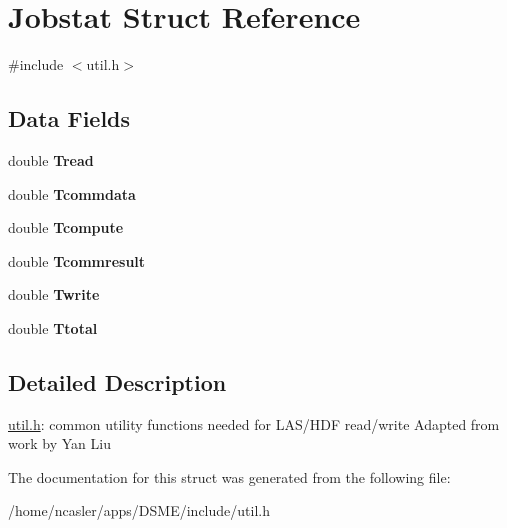 \hypertarget{structJobstat}{}\section{Jobstat Struct Reference}
\label{structJobstat}


{\ttfamily \#include $<$util.\+h$>$}

\subsection*{Data Fields}
\begin{DoxyCompactItemize}
\item 
\hypertarget{structJobstat_ada1786a003b0dc56e66dfe9b21ebb00e}{}double {\bfseries Tread}\label{structJobstat_ada1786a003b0dc56e66dfe9b21ebb00e}

\item 
\hypertarget{structJobstat_af277ce2c5fba23904835f4ddcabcb0d1}{}double {\bfseries Tcommdata}\label{structJobstat_af277ce2c5fba23904835f4ddcabcb0d1}

\item 
\hypertarget{structJobstat_ae45f1f3fb3677c761fc75feb90ff8c8a}{}double {\bfseries Tcompute}\label{structJobstat_ae45f1f3fb3677c761fc75feb90ff8c8a}

\item 
\hypertarget{structJobstat_a2197fac600e97d5034757ad75eb0ab39}{}double {\bfseries Tcommresult}\label{structJobstat_a2197fac600e97d5034757ad75eb0ab39}

\item 
\hypertarget{structJobstat_aad5476e2b35b4db54cdec349c25bd1c4}{}double {\bfseries Twrite}\label{structJobstat_aad5476e2b35b4db54cdec349c25bd1c4}

\item 
\hypertarget{structJobstat_aaa924e7bd413313082af0f7921065dcc}{}double {\bfseries Ttotal}\label{structJobstat_aaa924e7bd413313082af0f7921065dcc}

\end{DoxyCompactItemize}


\subsection{Detailed Description}
\hyperlink{util_8h_source}{util.\+h}\+: common utility functions needed for L\+A\+S/\+H\+D\+F read/write Adapted from work by Yan Liu 

The documentation for this struct was generated from the following file\+:\begin{DoxyCompactItemize}
\item 
/home/ncasler/apps/\+D\+S\+M\+E/include/util.\+h\end{DoxyCompactItemize}

